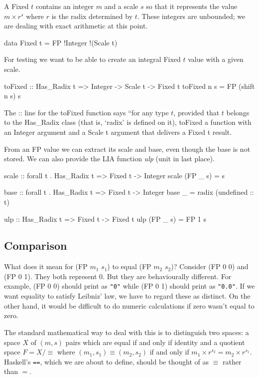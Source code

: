 \documentclass{article}
\begin{document}
A Fixed $t$ contains an integer $m$ and a scale $s$ so that it represents
the value $m\times r^s$ where $r$ is the radix determined by $t$.
These integers are unbounded; we are dealing with exact arithmetic
at this point.
\begin{code}
data Fixed t = FP !Integer !(Scale t)
\end{code}

For testing we want to be able to create an integral Fixed $t$
value with a given scale.

\begin{code}
toFixed :: Has_Radix t => Integer -> Scale t -> Fixed t
toFixed n s = FP (shift n s) s
\end{code}

The :: line for the toFixed function says ``for any type $t$,
provided that $t$ belongs to the Has\_Radix class (that is,
`radix' is defined on it), toFixed a function with an
Integer argument and a Scale t argument that delivers a Fixed t
result.

From an FP value we can extract its scale and base, even though
the base is not stored.  We can also provide the LIA function
{\it ulp} (unit in last place).

\begin{code}
scale :: forall t . Has_Radix t => Fixed t -> Integer
scale (FP _ s) = s

base :: forall t . Has_Radix t => Fixed t -> Integer
base _ = radix (undefined :: t)

ulp :: Has_Radix t => Fixed t -> Fixed t
ulp (FP _ s) = FP 1 s
\end{code}

\subsection{Comparison}

What does it mean for (FP $m_1$ $s_1$) to equal (FP $m_2$ $s_2$)?
Consider (FP 0 0) and (FP 0 1).  They both represent 0.  But they
are behaviourally different.  For example, (FP 0 0) should print
as \verb|"0"| while (FP 0 1) should print as \verb|"0.0"|.  If we
want equality to satisfy Leibniz' law, we have to regard these as
distinct.  On the other hand, it would be difficult to do numeric
calculations if zero wasn't equal to zero.

The standard mathematical way to deal with this is to distinguish
two spaces:  a space $X$ of $(m,s)$ pairs which are equal if and
only if identity and a quotient space $F = X/\equiv$ where
$(m_1,s_1) \equiv (m_2,s_2)$ if and only if $m_1\times r^{s_2} =
m_2 \times r^{s_1}$.  Haskell's \verb|==|, which we are about to
define, should be thought of as $\equiv$ rather than $=$.
\end{document}
